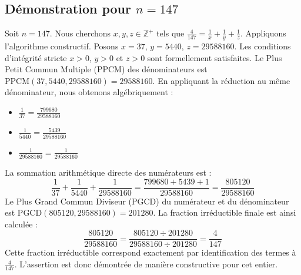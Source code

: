 \documentclass[11pt,a4paper]{article}
\begin{document}
\subsection{Démonstration pour $n = 147$}
Soit $n = 147$. Nous cherchons $x, y, z \in \mathbb{Z}^{+}$ tels que $\frac{4}{147} = \frac{1}{x} + \frac{1}{y} + \frac{1}{z}$.
Appliquons l'algorithme constructif. Posons $x = 37$, $y = 5440$, $z = 29588160$.
Les conditions d'intégrité stricte $x > 0$, $y > 0$ et $z > 0$ sont formellement satisfaites.
Le Plus Petit Commun Multiple (PPCM) des dénominateurs est $\text{PPCM}(37, 5440, 29588160) = 29588160$.
En appliquant la réduction au même dénominateur, nous obtenons algébriquement :
\begin{itemize}
    \item $\frac{1}{37} = \frac{799680}{29588160}$
    \item $\frac{1}{5440} = \frac{5439}{29588160}$
    \item $\frac{1}{29588160} = \frac{1}{29588160}$
\end{itemize}
La sommation arithmétique directe des numérateurs est :
$$ \frac{1}{37} + \frac{1}{5440} + \frac{1}{29588160} = \frac{799680 + 5439 + 1}{29588160} = \frac{805120}{29588160} $$
Le Plus Grand Commun Diviseur (PGCD) du numérateur et du dénominateur est $\text{PGCD}(805120, 29588160) = 201280$.
La fraction irréductible finale est ainsi calculée :
$$ \frac{805120}{29588160} = \frac{805120 \div 201280}{29588160 \div 201280} = \frac{4}{147} $$
Cette fraction irréductible correspond exactement par identification des termes à $\frac{4}{147}$. L'assertion est donc démontrée de manière constructive pour cet entier.
\end{document}
